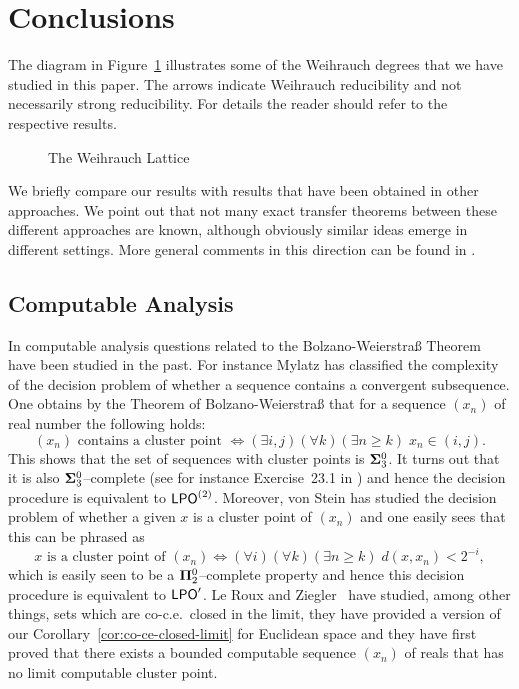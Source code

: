 \documentclass[a4paper]{amsart}
\newcommand{\SO}[1]{{{\bf\Sigma}^0_{#1}}}
\newcommand{\PO}[1]{{{\bf\Pi}^0_{#1}}}
\def\LPO{\text{\rm\sffamily LPO}}
\def\LPO{\mbox{\rm\sffamily LPO}}
\theoremstyle{definition}
\begin{document}
\section{Conclusions}
\label{sec:conclusions}

The diagram in Figure~\ref{fig:choice} illustrates some of the Weihrauch degrees that we
have studied in this paper. The arrows indicate Weihrauch reducibility and not necessarily
strong reducibility. For details the reader should refer to the respective results.
 
\begin{figure}[htbp]
\begin{center}
\begin{scriptsize}

\end{scriptsize}
\caption{The Weihrauch Lattice}
\label{fig:choice}
\end{center}
\end{figure}

We briefly compare our results with results that have been obtained in other approaches.
We point out that not many exact transfer theorems between these different approaches are
known, although obviously similar ideas emerge in different settings.
More general comments in this direction can be found in \cite{BG11a}.

\subsection{Computable Analysis}

In computable analysis questions related to the Bolzano-Weierstra\ss{} Theorem have been 
studied in the past. For instance Mylatz \cite{Myl92} has classified the complexity
of the decision problem of whether a sequence contains a convergent subsequence. 
One obtains by the Theorem of Bolzano-Weierstra\ss{}
that for a sequence $(x_n)$ of real number the following holds:
\[\mbox{$(x_n)$ contains a cluster point $\iff (\exists i,j)(\forall k)(\exists n\geq k)\;x_n\in(i,j)$.}\]
This shows that the set of sequences with cluster points is $\SO{3}$.
It turns out that it is also $\SO{3}$--complete (see for instance Exercise~23.1 in \cite{Kec95})
and hence the decision procedure is equivalent to $\LPO^{(2)}$.
Moreover, von Stein \cite{Ste89} has studied the decision problem of whether a given $x$ is a 
cluster point of $(x_n)$ and one easily sees that this can be phrased as
\[\mbox{$x$ is a cluster point of $(x_n)\iff (\forall i)(\forall k)(\exists n\geq k)\;d(x,x_n)<2^{-i}$},\]
which is easily seen to be a $\PO{2}$--complete property and hence this decision procedure is equivalent to $\LPO'$.
Le Roux and Ziegler~\cite{LZ08a} have studied, among other things, sets which are co-c.e.\ closed
in the limit, they have provided a version of our Corollary~\ref{cor:co-ce-closed-limit} for Euclidean space and they
have first proved that there exists a bounded computable sequence $(x_n)$ of reals that has no 
limit computable cluster point.
\end{document}

